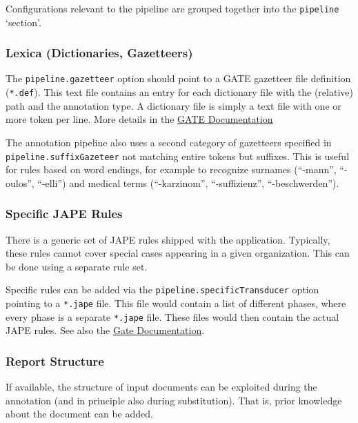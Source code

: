 Configurations relevant to the pipeline are grouped together into the
\texttt{pipeline} `section'.

\subsubsection{Lexica (Dictionaries,
Gazetteers)}\label{lexica-dictionaries-gazetteers}

The \texttt{pipeline.gazetteer} option should point to a GATE gazetteer
file definition (\texttt{*.def}). This text file contains an entry for
each dictionary file with the (relative) path and the annotation type. A
dictionary file is simply a text file with one or more token per line.
More details in the
\href{https://gate.ac.uk/sale/tao/splitch6.html\#x9-1270006.3}{GATE
Documentation}

The annotation pipeline also uses a second category of gazetteers
specified in \texttt{pipeline.suffixGazeteer} not matching entire tokens
but suffixes. This is useful for rules based on word endings, for
example to recognize surnames (``-mann'', ``-oulos'', ``-elli'') and
medical terms (``-karzinom'', ``-suffizienz'', ``-beschwerden'').

\subsubsection{Specific JAPE Rules}\label{specific-jape-rules}

There is a generic set of JAPE rules shipped with the application.
Typically, these rules cannot cover special cases appearing in a given
organization. This can be done using a separate rule set.

Specific rules can be added via the \texttt{pipeline.specificTransducer}
option pointing to a \texttt{*.jape} file. This file would contain a
list of different phases, where every phase is a separate
\texttt{*.jape} file. These files would then contain the actual JAPE
rules. See also the
\href{https://gate.ac.uk/sale/tao/splitch8.html\#x12-2310008.5}{Gate
Documentation}.

\subsubsection{Report Structure}\label{report-structure}

If available, the structure of input documents can be exploited during
the annotation (and in principle also during substitution). That is,
prior knowledge about the document can be added.


